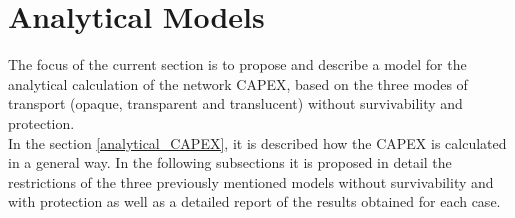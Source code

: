 
\chapter{Analytical Models}

The focus of the current section is to propose and describe a model for the analytical calculation of the network CAPEX, based on the three modes of transport (opaque, transparent and translucent) without survivability and protection.\\
In the section \ref{analytical_CAPEX}, it is described how the CAPEX is calculated in a general way. In the following subsections it is proposed in detail the restrictions of the three previously mentioned models without survivability and with protection as well as a detailed report of the results obtained for each case.








